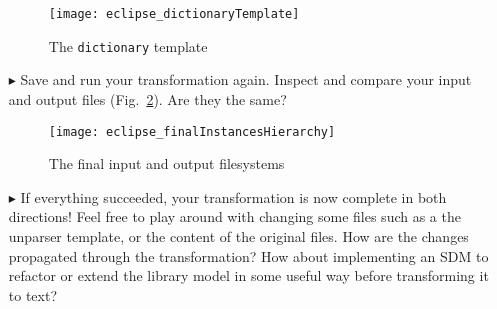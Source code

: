 \begin{itemize}
\vspace{0.5cm}

\begin{figure}[htpb]
\begin{center}
  \texttt{[image: eclipse\_dictionaryTemplate]}
  \caption{The \texttt{dictionary} template}
  \label{eclipse:dictionaryTemplate}
\end{center}
\end{figure}


\item[$\blacktriangleright$] Save and run your transformation again. Inspect and compare your input and output files (Fig.~\ref{eclipse:unparseResult}). Are
they the same?

\vspace{0.5cm}

\begin{figure}[htpb]
\begin{center}
  \texttt{[image: eclipse\_finalInstancesHierarchy]}
  \caption{The final input and output filesystems}
  \label{eclipse:unparseResult}
\end{center}
\end{figure}

\item[$\blacktriangleright$] If everything succeeded, your transformation is now complete in both directions! Feel free to play around with
changing some files such as a the unparser template, or the content of the original files. How are the changes propagated through the transformation?
How about implementing an SDM to refactor or extend the library model in some useful way before transforming it to text?

\end{itemize}